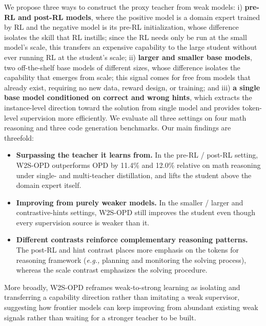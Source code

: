 \documentclass{article}
\newcommand{\eg}{\textit{e.g., }}
\newcommand\ours{W2S-OPD\xspace}
\begin{document}
We propose three ways to construct the proxy teacher from weak models: i) \textbf{pre-RL and post-RL models}, where the positive model is a domain expert trained by RL and the negative model is its pre-RL initialization, whose difference isolates the skill that RL instills; since the RL needs only be run at the small model's scale, this transfers an expensive capability to the large student without ever running RL at the student's scale; ii) \textbf{larger and smaller base models}, two off-the-shelf base models of different sizes, whose difference isolates the capability that emerges from scale; this signal comes for free from models that already exist, requiring no new data, reward design, or training; and iii) \textbf{a single base model conditioned on correct and wrong hints}, which extracts the instance-level direction toward the solution from single model and provides token-level supervision more efficiently.
We evaluate all three settings on four math reasoning and three code generation benchmarks.
Our main findings are threefold: 
\begin{itemize}[nosep, leftmargin=1.5em]
\item \textbf{Surpassing the teacher it learns from.} In the pre-RL / post-RL setting, \ours outperforms OPD by 11.4\% and 12.0\% relative on math reasoning under single- and multi-teacher distillation, and lifts the student above the domain expert itself.
\item \textbf{Improving from purely weaker models.} In the smaller / larger and contrastive-hints settings, \ours still improves the student even though every supervision source is weaker than it.
\item \textbf{Different contrasts reinforce complementary reasoning patterns.} The post-RL and hint contrast places more emphasis on the tokens for reasoning framework (\eg planning and monitoring the solving process), whereas the scale contrast emphasizes the solving procedure.
\end{itemize}

More broadly, \ours reframes weak-to-strong learning as isolating and transferring a capability direction rather than imitating a weak supervisor, suggesting how frontier models can keep improving from abundant existing weak signals rather than waiting for a stronger teacher to be built.
\end{document}
